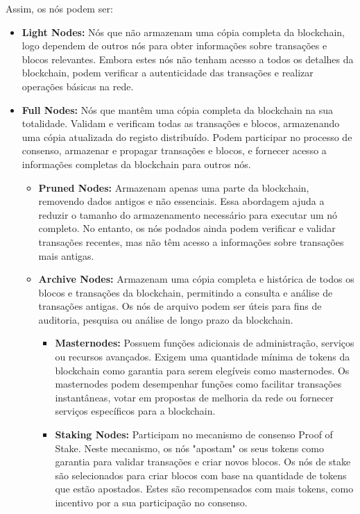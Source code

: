 \documentclass[conference]{IEEEtran}
\begin{document}
    Assim, os nós podem ser:
    \begin{itemize}
        \item \textbf{Light Nodes:} Nós que não armazenam uma cópia completa da blockchain, logo dependem de outros nós para obter informações sobre transações e blocos relevantes. Embora estes nós não tenham acesso a todos os detalhes da blockchain, podem verificar a autenticidade das transações e realizar operações básicas na rede.
        \item \textbf{Full Nodes:} Nós que mantêm uma cópia completa da blockchain na sua totalidade. Validam e verificam todas as transações e blocos, armazenando uma cópia atualizada do registo distribuído. Podem participar no processo de consenso, armazenar e propagar transações e blocos, e fornecer acesso a informações completas da blockchain para outros nós.
        \begin{itemize}
            \item \textbf{Pruned Nodes:} Armazenam apenas uma parte da blockchain, removendo dados antigos e não essenciais. Essa abordagem ajuda a reduzir o tamanho do armazenamento necessário para executar um nó completo. No entanto, os nós podados ainda podem verificar e validar transações recentes, mas não têm acesso a informações sobre transações mais antigas.
            \item \textbf{Archive Nodes:} Armazenam uma cópia completa e histórica de todos os blocos e transações da blockchain, permitindo a consulta e análise de transações antigas. Os nós de arquivo podem ser úteis para fins de auditoria, pesquisa ou análise de longo prazo da blockchain.
            \begin{itemize}
                \item \textbf{Masternodes:} Possuem funções adicionais de administração, serviços ou recursos avançados. Exigem uma quantidade mínima de tokens da blockchain como garantia para serem elegíveis como masternodes. Os masternodes podem desempenhar funções como facilitar transações instantâneas, votar em propostas de melhoria da rede ou fornecer serviços específicos para a blockchain.
                \item \textbf{Staking Nodes:} Participam no mecanismo de consenso Proof of Stake. Neste mecanismo, os nós "apostam" os seus tokens como garantia para validar transações e criar novos blocos. Os nós de stake são selecionados para criar blocos com base na quantidade de tokens que estão apostados. Estes são recompensados com mais tokens, como incentivo por a sua participação no consenso.

\end{itemize}
\end{itemize}
\end{itemize}
\end{document}
